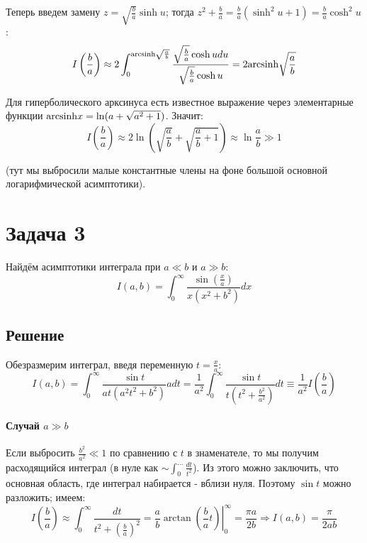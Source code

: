 \documentclass[a4paper,12pt]{article}
\begin{document}
\noindent
Теперь введем замену $z=\sqrt{\frac{b}{a}}\sinh u$; тогда $z^{2}+\frac{b}{a}=\frac{b}{a}\left(\sinh^{2}u+1\right)=\frac{b}{a}\cosh^{2}u$:
\[
I\left(\frac{b}{a}\right)\approx2\int_{0}^{{\rm arcsinh}\sqrt{\frac{a}{b}}}\frac{\sqrt{\frac{b}{a}}\cosh udu}{\sqrt{\frac{b}{a}}\cosh u}=2{\rm arcsinh}\sqrt{\frac{a}{b}}
\]

\noindent
Для гиперболического арксинуса есть известное выражение через элементарные функции ${\rm arcsinh}x = \ln(a + \sqrt{a^2+1})$. Значит:
\[
I\left(\frac{b}{a}\right)\approx2\ln\left(\sqrt{\frac{a}{b}}+\sqrt{\frac{a}{b}+1}\right)\approx\ln\frac{a}{b}\gg1
\]

\noindent
(тут мы выбросили малые константные члены на фоне большой основной логарифмической асимптотики).


\section*{Задача 3}

Найдём асимптотики интеграла при $a\ll b$ и $a\gg b$:
\[
I\left(a,b\right)=\int_{0}^{\infty}\frac{\sin(\frac{x}{a})}{x(x^{2}+b^{2})}dx
\]



\subsection*{Решение}

Обезразмерим интеграл, введя переменную $t=\frac{x}{a}$:
\[
I\left(a,b\right)=\int_{0}^{\infty}\frac{\sin t}{at(a^{2}t^{2}+b^{2})}adt=\frac{1}{a^{2}}\int_{0}^{\infty}\frac{\sin t}{t\left(t^{2}+\frac{b^{2}}{a^{2}}\right)}dt\equiv\frac{1}{a^{2}}I\left(\frac{b}{a}\right)
\]



\paragraph{Случай $a\gg b$}

Если выбросить $\frac{b^{2}}{a^{2}}\ll1$ по сравнению с $t$ в знаменателе,
то мы получим расходящийся интеграл (в нуле как $\sim\int_{0}^{\dots}\frac{dt}{t^{2}}$).
Из этого можно заключить, что основная область, где интеграл набирается
- вблизи нуля. Поэтому $\sin t$ можно разложить; имеем:
\[
I\left(\frac{b}{a}\right)\approx\int_{0}^{\infty}\frac{dt}{t^{2}+\left(\frac{b}{a}\right)^{2}}=\frac{a}{b}\left.\arctan\left(\frac{b}{a}t\right)\right|_{0}^{\infty}=\frac{\pi a}{2b}\Rightarrow I(a,b) = \frac{\pi}{2 a b}
\]
\end{document}
